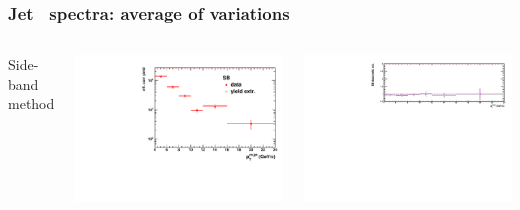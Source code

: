 \documentclass[xcolor={usenames,dvipsnames}]{beamer}
\begin{document}
\begin{frame}
\frametitle{Jet \pt\ spectra: average of variations}

\begin{columns}[c] 

\column{5.5cm} 
\footnotesize{Side-band method}
\begin{minipage}{1.\linewidth}
\includegraphics[width=0.95\linewidth]{img/rawYieldpPb/jetPtComparison_DataMVariation_SB.pdf}
\end{minipage}
\begin{minipage}{1.\linewidth}
\includegraphics[width=0.95\linewidth]{img/rawYieldpPb/SBRatio.pdf}
\end{minipage}


\end{columns}
\end{frame}
\end{document}
